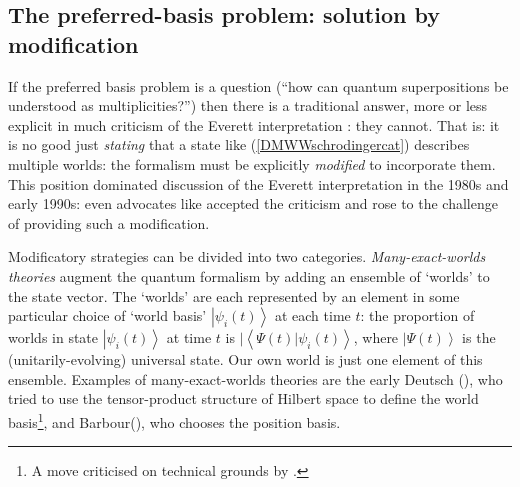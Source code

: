 \documentclass[12pt]{article}
\newcommand{\ket}[1]{\ensuremath{\left|  #1 \right\rangle}}
\newcommand{\bk}[2]{\ensuremath{\left\langle #1 | #2 \right\rangle}}
\begin{document}
\subsection{The preferred-basis problem: solution by modification}\label{DMWWmodification}

If the preferred basis problem is a question (``how can quantum superpositions be understood as multiplicities?'') then there is a traditional answer, more or less explicit in much criticism of the Everett interpretation \cite{barrettbook,kent,butterfieldeverett}: they cannot. That is: it is no good just \emph{stating} that a state like (\ref{DMWWschrodingercat}) describes multiple worlds: the formalism must be explicitly \emph{modified} to incorporate them. This position dominated discussion of the Everett interpretation in the 1980s and early 1990s: even advocates like  accepted the criticism and rose to the challenge of providing such a modification.

Modificatory strategies can  be divided into two categories.
\emph{Many-exact-worlds theories} augment the quantum formalism by adding an ensemble of `worlds' to the state vector. The `worlds' are each represented by an element in some particular choice of `world basis' $\ket{\psi_i(t)}$ at each time $t$: the proportion of worlds in state $\ket{\psi_i(t)}$ at time $t$ is $|\bk{\Psi(t)}{\psi_i(t)}$, where \ket{\Psi(t)} is the (unitarily-evolving) universal state. Our own world is just one element of this ensemble. 
Examples of many-exact-worlds theories are the early Deutsch (), who tried to use the tensor-product structure of Hilbert space to define the world basis\footnote{A move criticised on technical grounds by .}, and Barbour(), who chooses the position basis.
\end{document}
